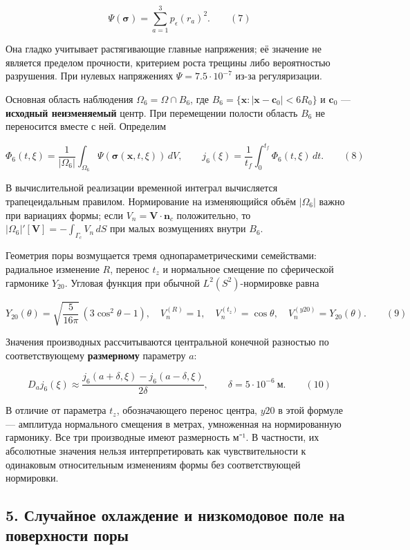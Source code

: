 \documentclass[
]{article}
\begin{document}
\[
\Psi(\boldsymbol\sigma)=\sum_{a=1}^{3}p_\epsilon(r_a)^2. \qquad(7)
\]

Она гладко учитывает растягивающие главные напряжения; её значение не
является пределом прочности, критерием роста трещины либо вероятностью
разрушения. При нулевых напряжениях \(\Psi=7.5\cdot10^{-7}\) из-за
регуляризации.

Основная область наблюдения \(\Omega_6=\Omega\cap B_6\), где
\(B_6=\{\boldsymbol x:|\boldsymbol x-\boldsymbol c_0|<6R_0\}\) и
\(\boldsymbol c_0\) --- \textbf{исходный неизменяемый} центр. При
перемещении полости область \(B_6\) не переносится вместе с ней.
Определим

\[
\Phi_6(t,\xi)=\frac{1}{|\Omega_6|}\int_{\Omega_6}\Psi(\boldsymbol\sigma(\boldsymbol x,t,\xi))\,dV,
\qquad j_6(\xi)=\frac{1}{t_f}\int_0^{t_f}\Phi_6(t,\xi)\,dt. \qquad(8)
\]

В вычислительной реализации временной интеграл вычисляется
трапецеидальным правилом. Нормирование на изменяющийся объём
\(|\Omega_6|\) важно при вариациях формы; если
\(V_n=\boldsymbol V\cdot\boldsymbol n_c\) положительно, то
\(|\Omega_6|'[\boldsymbol V]=-\int_{\Gamma_c}V_n\,dS\) при малых
возмущениях внутри \(B_6\).

Геометрия поры возмущается тремя однопараметрическими семействами:
радиальное изменение \(R\), перенос \(t_z\) и нормальное смещение по
сферической гармонике \(Y_{20}\). Угловая функция при обычной
\(L^2(S^2)\)-нормировке равна

\[
Y_{20}(\theta)=\sqrt{\frac{5}{16\pi}}\,(3\cos^2\theta-1),\quad
V_n^{(R)}=1,\quad V_n^{(t_z)}=\cos\theta,\quad V_n^{(y20)}=Y_{20}(\theta). \qquad(9)
\]

Значения производных рассчитываются центральной конечной разностью по
соответствующему \textbf{размерному} параметру \(a\):

\[
D_a j_6(\xi)\approx\frac{j_6(a+\delta,\xi)-j_6(a-\delta,\xi)}{2\delta},\qquad \delta=5\cdot10^{-6}\ \text{м}. \qquad(10)
\]

В отличие от параметра \(t_z\), обозначающего перенос центра, \(y20\) в
этой формуле --- амплитуда нормального смещения в метрах, умноженная на
нормированную гармонику. Все три производные имеют размерность м⁻¹. В
частности, их абсолютные значения нельзя интерпретировать как
чувствительности к одинаковым относительным изменениям формы без
соответствующей нормировки.

\subsection{5. Случайное охлаждение и низкомодовое поле на поверхности
поры}\label{ux441ux43bux443ux447ux430ux439ux43dux43eux435-ux43eux445ux43bux430ux436ux434ux435ux43dux438ux435-ux438-ux43dux438ux437ux43aux43eux43cux43eux434ux43eux432ux43eux435-ux43fux43eux43bux435-ux43dux430-ux43fux43eux432ux435ux440ux445ux43dux43eux441ux442ux438-ux43fux43eux440ux44b}
\end{document}
